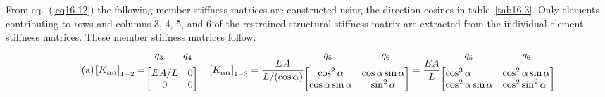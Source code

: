 \documentclass{AeroStructure-ERJohnson}
\begin{document}
\begin{example*}
From eq.~(\ref{eq16.12}) the following member stiffness matrices are constructed using the direction cosines in table~\ref{tab16.3}. Only elements contributing to rows and columns 3, 4, 5, and 6 of the restrained structural stiffness matrix are extracted from the individual element stiffness matrices. These member stiffness matrices follow:
\begin{gather}\label{eq16.4a}\tag{a}
\left[K_{\alpha \alpha}\right]_{1-2}=\!\begin{array}{@{}c@{}}
\begin{array}{@{}ccc@{}}\phantom{0.}q_{3}& &q_{4}\phantom{0} \end{array}\\[6pt]\left[\begin{array}{@{}cr@{}}E A / L & 0 \\0 & 0\end{array}\right]\end{array}
\quad\left[K_{\alpha \alpha}\right]_{1-3}=\frac{E A}{L /(\cos \alpha)}\begin{array}{@{}c@{}}
{\arraycolsep=5pt\begin{array}{@{}cc@{}}q_{5}\phantom{0000} & \phantom{0000}q_{6} \end{array}}\\[6pt]\left[\begin{array}{@{}cc@{}}\cos ^{2} \alpha & \cos \alpha \sin \alpha \\\cos \alpha \sin \alpha & \sin ^{2} \alpha\end{array}\right]\end{array}=\frac{E A}{L}\begin{array}{@{}c@{}}{\arraycolsep=5pt\begin{array}{@{}cc@{}}
q_{5}\phantom{0000} & \phantom{0000}q_{6} \end{array}}\\[6pt]\left[\begin{array}{@{}ll@{}}\cos ^{3} \alpha & \cos ^{2} \alpha \sin \alpha \\\cos ^{2} \alpha \sin \alpha & \cos ^{2} \sin ^{2} \alpha\end{array}\right]\end{array}\\

\end{gather}
\end{example*}
\end{document}
